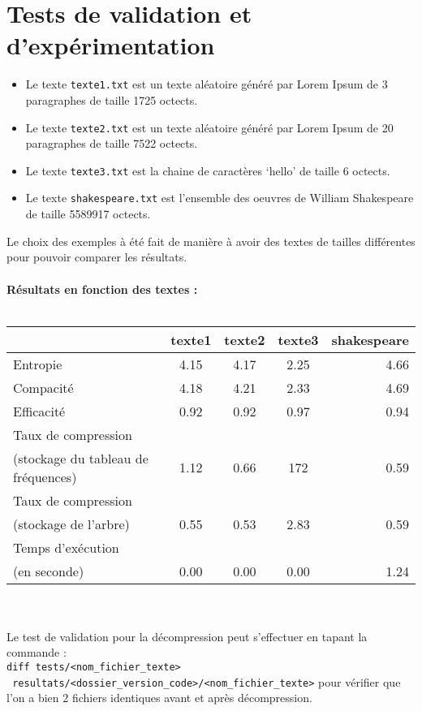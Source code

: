 \documentclass[a4paper,11pt]{article}
\begin{document}
\section{Tests de validation et d'expérimentation} 
\begin{itemize}
\item Le texte \verb+texte1.txt+ est un texte aléatoire généré par Lorem Ipsum de 3 paragraphes de taille 1725 octects.
\item Le texte \verb+texte2.txt+ est un texte aléatoire généré par Lorem Ipsum de 20 paragraphes de taille 7522 octects.
\item Le texte \verb+texte3.txt+ est la chaine de caractères `hello' de taille 6 octects.
\item Le texte \verb+shakespeare.txt+ est l'ensemble des oeuvres de William Shakespeare de taille 5589917 octects.
\end{itemize}
Le choix des exemples à été fait de manière à avoir des textes de tailles différentes pour pouvoir comparer les résultats.\\\\
\vspace{5mm}
\textbf{ Résultats en fonction des textes :} \\\\
\begin{tabular}{|l|c|c|c|r|}
\hline
& texte1 & texte2 & texte3 & shakespeare \\
\hline
Entropie & 4.15 & 4.17 & 2.25 & 4.66 \\
\hline
Compacité & 4.18 & 4.21 & 2.33 & 4.69 \\
\hline
Efficacité & 0.92 & 0.92 & 0.97 & 0.94 \\
\hline
Taux de compression & & & & \\
(stockage du tableau de fréquences) & 1.12 & 0.66 & 172 & 0.59 \\
\hline
Taux de compression & & & & \\
(stockage de l'arbre) & 0.55  & 0.53  & 2.83  &  0.59\\
\hline
Temps d'exécution & & & &\\
(en seconde) & 0.00 & 0.00 & 0.00 & 1.24 \\
\hline
\end{tabular}
\\\\
Le test de validation pour la décompression peut s'effectuer en tapant la commande :\\
\verb+diff tests/<nom_fichier_texte>+\\
\verb+ resultats/<dossier_version_code>/<nom_fichier_texte>+ pour vérifier que l'on a bien 2 fichiers identiques avant et après décompression.
\end{document}
